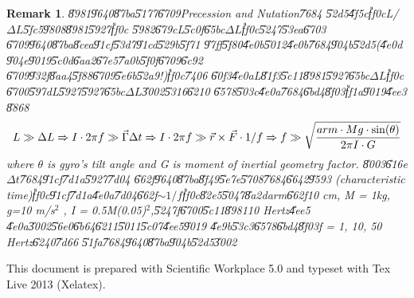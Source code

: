 \documentclass[12pt]{article}
\newtheorem{remark}[theorem]{Remark}
\begin{document}
\begin{remark}
\U{8981}\U{9640}\U{87ba}\U{5177}\U{6709}Precession and Nutation\U{7684}%
\U{52d5}\U{4f5c}\U{ff0c}L/$\Delta L$\U{5fc5}\U{9808}\U{8981}\U{5927}\U{ff0c}%
\U{5982}\U{679c}L\U{5c0f}\U{65bc}$\Delta L$\U{ff0c}\U{5247}\U{53ea}\U{6703}%
\U{6709}\U{9640}\U{87ba}\U{8cea}\U{91cf}\U{53d7}\U{91cd}\U{529b}\U{5f71}%
\U{97ff}\U{5f80}\U{4e0b}\U{5012}\U{4e0b}\U{7684}\U{904b}\U{52d5}(\U{4e0d}%
\U{904e}\U{9019}\U{5c0d}\U{6aa2}\U{67e5}\U{7a0b}\U{5f0f}\U{6709}\U{6c92}%
\U{6709}\U{932f}\U{8aa4}\U{5f88}\U{6709}\U{5e6b}\U{52a9}!)\U{ff0c}\U{7406}%
\U{60f3}\U{4e0a}L\U{81f3}\U{5c11}\U{8981}\U{5927}\U{65bc}$\Delta L$\U{ff0c}%
\U{6700}\U{597d}L\U{5927}\U{5927}\U{65bc}$\Delta L$\U{3002}\U{5316}\U{6210}%
\U{6578}\U{503c}\U{4e0a}\U{7684}\U{6bd4}\U{8f03}\U{ff1a}\U{9019}\U{4ee3}%
\U{8868}%
\begin{equation}
L\gg \Delta L\Rightarrow I\cdot 2\pi f\gg \vec{\Gamma}\Delta t\Rightarrow
I\cdot 2\pi f\gg \vec{r}\times \vec{F}\cdot 1/f\Rightarrow f\gg \sqrt{\frac{%
arm\cdot Mg\cdot \sin (\theta )}{2\pi I\cdot G}}
\end{equation}%
where $\theta $ is gyro's tilt angle and G is moment of inertial geometry
factor. \U{8003}\U{616e}$\Delta t$\U{7684}\U{91cf}\U{7d1a}\U{5927}\U{7d04}%
\U{662f}\U{9640}\U{87ba}\U{8f49}\U{5e7e}\U{5708}\U{7684}\U{6642}\U{9593}%
(characteristic time)\U{ff0c}\U{91cf}\U{7d1a}\U{4e0a}\U{7d04}\U{662f}$\sim
1/f$\U{ff0c}\U{82e5}\U{5047}\U{8a2d}arm\U{662f}10 cm, M = 1kg, g=10 m/s$^{2}$%
, I = 0.5M(0.05)$^{2}$,\U{5247}f\U{6700}\U{5c11}\U{8981}10 Hertz\U{4ee5}%
\U{4e0a}\U{3002}\U{56e0}\U{6b64}\U{6211}\U{5011}\U{5c07}\U{4ee5}\U{9019}%
\U{4e9b}\U{53c3}\U{6578}\U{6bd4}\U{8f03}f = 1, 10, 50 Hertz\U{6240}\U{7d66}%
\U{51fa}\U{7684}\U{9640}\U{87ba}\U{904b}\U{52d5}\U{3002}
\end{remark}

\href{https://drive.google.com/file/d/0B96HmLH-SQVmekx0a0RoSVFzWFE/edit?usp=sharing%
}{\underline{\color{blue}}}

\href{http://tinypic.com/r/10cw9yf/8}{\underline{\color{blue}%
}}

This document is prepared with Scientific Workplace 5.0 and typeset with Tex
Live 2013 (Xelatex).
\end{document}
